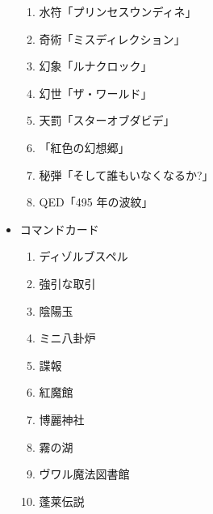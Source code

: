 \documentclass[line_length=22zw,number_of_lines=45,twocolumn]{jlreq}
\begin{document}
\begin{itemize}
\begin{enumerate}
			\item 水符「プリンセスウンディネ」
			\item 奇術「ミスディレクション」
			\item 幻象「ルナクロック」
			\item 幻世「ザ・ワールド」
			\item 天罰「スターオブダビデ」
			\item 「紅色の幻想郷」
			\item 秘弾「そして誰もいなくなるか?」
			\item QED「495 年の波紋」
		\end{enumerate}
	\item コマンドカード
		\begin{enumerate}
			\item ディゾルブスペル
			\item 強引な取引
			\item 陰陽玉
			\item ミニ八卦炉
			\item 諜報
			\item 紅魔館
			\item 博麗神社
			\item 霧の湖
			\item ヴワル魔法図書館
			\item 蓬莱伝説
		\end{enumerate}
\end{itemize}
\pagebreak
\end{document}
